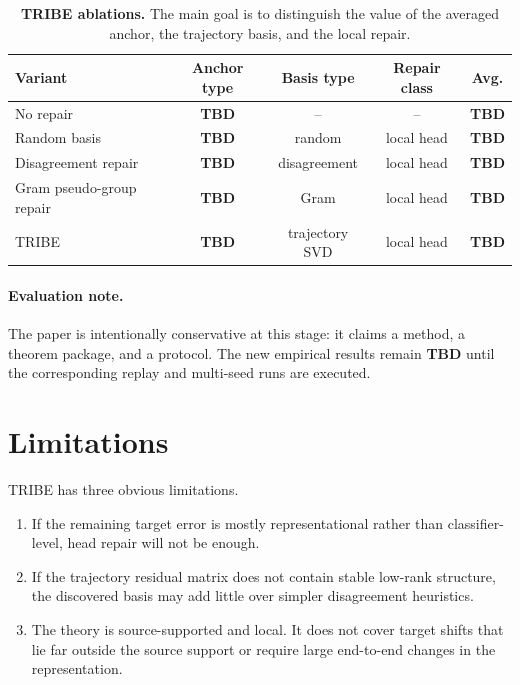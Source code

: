 \documentclass{article}
\newcommand{\TBD}{\textbf{TBD}}
\newcommand{\tribe}{\textup{\textsc{TRIBE}}}
\newcommand{\1}{\mathbbm{1}}
\begin{document}
\begin{table}[t]
    \centering
    \caption{\textbf{\tribe{} ablations.} The main goal is to distinguish the value of the averaged anchor, the trajectory basis, and the local repair.}
    \label{tab:tribe_ablation}
    \begin{tabular}{lcccc}
        \toprule
        Variant & Anchor type & Basis type & Repair class & Avg. \\
        \midrule
        No repair & \TBD{} & -- & -- & \TBD{} \\
        Random basis & \TBD{} & random & local head & \TBD{} \\
        Disagreement repair & \TBD{} & disagreement & local head & \TBD{} \\
        Gram pseudo-group repair & \TBD{} & Gram & local head & \TBD{} \\
        \tribe{} & \TBD{} & trajectory SVD & local head & \TBD{} \\
        \bottomrule
    \end{tabular}
\end{table}

\paragraph{Evaluation note.}
The paper is intentionally conservative at this stage: it claims a method, a theorem package, and a protocol. The new empirical results remain \TBD{} until the corresponding replay and multi-seed runs are executed.

\section{Limitations}

\tribe{} has three obvious limitations.
\begin{enumerate}[leftmargin=1.4em]
    \item If the remaining target error is mostly representational rather than classifier-level, head repair will not be enough.
    \item If the trajectory residual matrix does not contain stable low-rank structure, the discovered basis may add little over simpler disagreement heuristics.
    \item The theory is source-supported and local. It does not cover target shifts that lie far outside the source support or require large end-to-end changes in the representation.
\end{enumerate}
\end{document}
